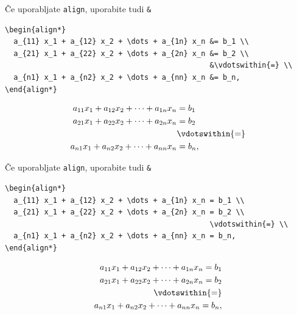 \documentclass[aspectratio=169]{beamer}
\begin{document}
\begin{frame}[fragile]{Če uporabljate \texttt{align}, uporabite tudi \texttt{\&}}
  \begin{dobroenv}
    \begin{verbatim}
\begin{align*}
  a_{11} x_1 + a_{12} x_2 + \dots + a_{1n} x_n &= b_1 \\
  a_{21} x_1 + a_{22} x_2 + \dots + a_{2n} x_n &= b_2 \\
                                               &\vdotswithin{=} \\
  a_{n1} x_1 + a_{n2} x_2 + \dots + a_{nn} x_n &= b_n,
\end{align*}
    \end{verbatim}
    \small
    \begin{align*}
      a_{11} x_1 + a_{12} x_2 + \dots + a_{1n} x_n &= b_1 \\
      a_{21} x_1 + a_{22} x_2 + \dots + a_{2n} x_n &= b_2 \\
      &\vdotswithin{=} \\
      a_{n1} x_1 + a_{n2} x_2 + \dots + a_{nn} x_n &= b_n,
    \end{align*}
  \end{dobroenv}
\end{frame}

\begin{frame}[fragile]{Če uporabljate \texttt{align}, uporabite tudi \texttt{\&}}
  \begin{slaboenv}
    \begin{verbatim}
\begin{align*}
  a_{11} x_1 + a_{12} x_2 + \dots + a_{1n} x_n = b_1 \\
  a_{21} x_1 + a_{22} x_2 + \dots + a_{2n} x_n = b_2 \\
                                               \vdotswithin{=} \\
  a_{n1} x_1 + a_{n2} x_2 + \dots + a_{nn} x_n = b_n,
\end{align*}
    \end{verbatim}
    \small
    \begin{align*}
      a_{11} x_1 + a_{12} x_2 + \dots + a_{1n} x_n = b_1 \\
      a_{21} x_1 + a_{22} x_2 + \dots + a_{2n} x_n = b_2 \\
      \vdotswithin{=} \\
      a_{n1} x_1 + a_{n2} x_2 + \dots + a_{nn} x_n = b_n,
    \end{align*}
  \end{slaboenv}
\end{frame}
\end{document}
